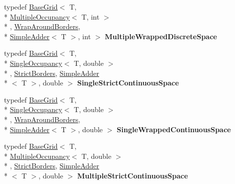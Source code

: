 \begin{DoxyCompactItemize}
\item 
\hypertarget{structrepast_1_1_spaces_a02357e8d89511877a8c834a84b473b1b}{typedef \hyperlink{classrepast_1_1_base_grid}{Base\-Grid}$<$ T, \\*
\hyperlink{classrepast_1_1_multiple_occupancy}{Multiple\-Occupancy}$<$ T, int $>$\\*
, \hyperlink{classrepast_1_1_wrap_around_borders}{Wrap\-Around\-Borders}, \\*
\hyperlink{classrepast_1_1_simple_adder}{Simple\-Adder}$<$ T $>$, int $>$ {\bfseries Multiple\-Wrapped\-Discrete\-Space}}\label{structrepast_1_1_spaces_a02357e8d89511877a8c834a84b473b1b}

\item 
\hypertarget{structrepast_1_1_spaces_ac927057c00aeef739a874996fb6e4c5c}{typedef \hyperlink{classrepast_1_1_base_grid}{Base\-Grid}$<$ T, \\*
\hyperlink{classrepast_1_1_single_occupancy}{Single\-Occupancy}$<$ T, double $>$\\*
, \hyperlink{classrepast_1_1_strict_borders}{Strict\-Borders}, \hyperlink{classrepast_1_1_simple_adder}{Simple\-Adder}\\*
$<$ T $>$, double $>$ {\bfseries Single\-Strict\-Continuous\-Space}}\label{structrepast_1_1_spaces_ac927057c00aeef739a874996fb6e4c5c}

\item 
\hypertarget{structrepast_1_1_spaces_a648e97a3acc35df1c616ca4adfb4533c}{typedef \hyperlink{classrepast_1_1_base_grid}{Base\-Grid}$<$ T, \\*
\hyperlink{classrepast_1_1_single_occupancy}{Single\-Occupancy}$<$ T, double $>$\\*
, \hyperlink{classrepast_1_1_wrap_around_borders}{Wrap\-Around\-Borders}, \\*
\hyperlink{classrepast_1_1_simple_adder}{Simple\-Adder}$<$ T $>$, double $>$ {\bfseries Single\-Wrapped\-Continuous\-Space}}\label{structrepast_1_1_spaces_a648e97a3acc35df1c616ca4adfb4533c}

\item 
\hypertarget{structrepast_1_1_spaces_aa1c4f2133dc0a0e3a88105bcb30d5cbe}{typedef \hyperlink{classrepast_1_1_base_grid}{Base\-Grid}$<$ T, \\*
\hyperlink{classrepast_1_1_multiple_occupancy}{Multiple\-Occupancy}$<$ T, double $>$\\*
, \hyperlink{classrepast_1_1_strict_borders}{Strict\-Borders}, \hyperlink{classrepast_1_1_simple_adder}{Simple\-Adder}\\*
$<$ T $>$, double $>$ {\bfseries Multiple\-Strict\-Continuous\-Space}}\label{structrepast_1_1_spaces_aa1c4f2133dc0a0e3a88105bcb30d5cbe}


\end{DoxyCompactItemize}
